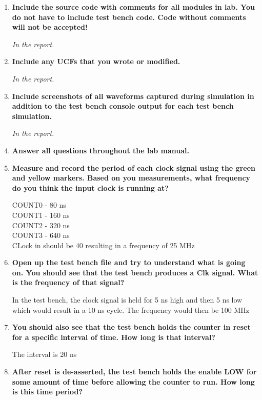 \documentclass[a4paper,12pt]{article}
\begin{document}
\begin{enumerate}
  \item \textbf{Include the source code with comments for all modules in lab. You do not have to include test bench
  code. Code without comments will not be accepted!}

  \textit{In the report.}
  
  \item \textbf{Include any UCFs that you wrote or modified.}

  \textit{In the report.}
  
  \item \textbf{Include screenshots of all waveforms captured during simulation in addition to the test bench console
  output for each test bench simulation.}

  \textit{In the report.}

  \item \textbf{Answer all questions throughout the lab manual.}

  \item \textbf{Measure and record the period of each clock signal using the green and yellow markers. 
  Based on you measurements, what frequency do you think the input clock is running at?}
  
  COUNT0 - 80 ns \\
  COUNT1 - 160 ns \\
  COUNT2 - 320 ns \\
  COUNT3 - 640 ns \\
  CLock in should be 40 resulting in a frequency of 25 MHz
  
  \item \textbf{Open up the test bench file and try to understand what is going on. You should see that the test
  bench produces a Clk signal. What is the frequency of that signal?}
  
  In the test bench, the clock signal is held for 5 ns high and then 5 ns low which would result in a 10 ns cycle. The frequency would then be 100 MHz
  
  \item \textbf{You should also see that the test bench holds the counter in reset for a specific interval of time. How long is that interval?}
  
  The interval is 20 ns
  
  \item \textbf{After reset is de-asserted, the test bench holds the enable LOW for some amount of time before 
  allowing the counter to run. How long is this time period?}
  

\end{enumerate}
\end{document}
